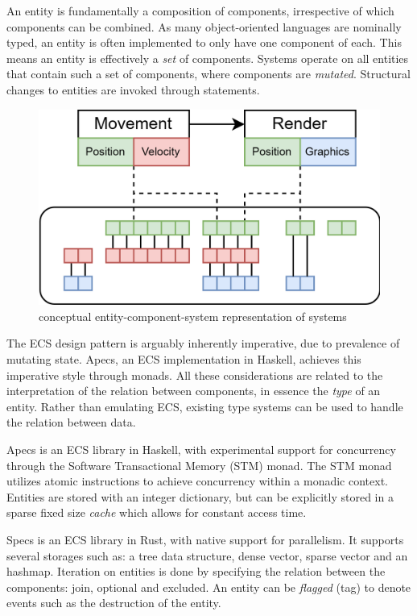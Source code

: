 \documentclass{article}
\begin{document}
An entity is fundamentally a composition of components, irrespective of which components can be combined.
As many object-oriented languages are nominally typed, an entity is often implemented to only have one component of each.
This means an entity is effectively a {\it set} of components.
Systems operate on all entities that contain such a set of components, where components are {\it mutated}.
Structural changes to entities are invoked through statements.

\begin{figure}[ht]
    \centering
    \includegraphics[scale=0.2]{ecs}
    \caption{ conceptual entity-component-system representation of systems }
\end{figure}

The ECS design pattern is arguably inherently imperative, due to prevalence of mutating state. 
Apecs, an ECS implementation in Haskell, achieves this imperative style through monads\cite{ecs-apecs}.
All these considerations are related to the interpretation of the relation between components, in essence the {\it type} of an entity. 
Rather than emulating ECS, existing type systems can be used to handle the relation between data.

Apecs\cite{ecs-apecs} is an ECS library in Haskell, with experimental support for concurrency through the Software Transactional Memory (STM) monad\cite{STM-monad}.
The STM monad utilizes atomic instructions to achieve concurrency within a monadic context.
Entities are stored with an integer dictionary, but can be explicitly stored in a sparse fixed size {\it cache} which allows for constant access time. 

Specs is an ECS library in Rust\cite{ecs-specs}, with native support for parallelism.
It supports several storages such as: a tree data structure, dense vector, sparse vector and an hashmap.
Iteration on entities is done by specifying the relation between the components: join, optional and excluded.
An entity can be {\it flagged} (tag) to denote events such as the destruction of the entity.
\end{document}
